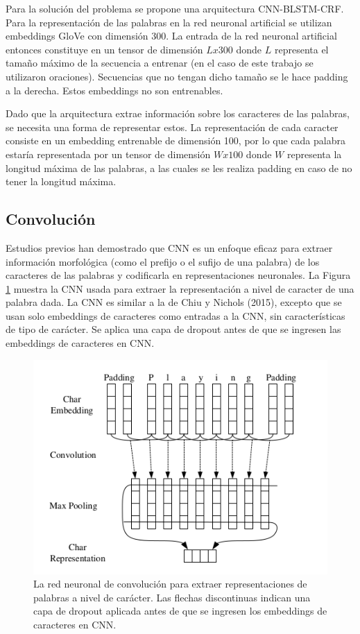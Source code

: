 \documentclass[runningheads]{llncs}
\begin{document}
Para la solución del problema se propone una arquitectura CNN-BLSTM-CRF. Para la representación
de las palabras en la red neuronal artificial se utilizan embeddings GloVe con dimensión 300.
La entrada de la red neuronal artificial entonces constituye en un tensor de dimensión 
$Lx300$ donde $L$ representa el tamaño máximo de la secuencia a entrenar (en el caso de este trabajo
se utilizaron oraciones). Secuencias que no tengan dicho tamaño se le hace padding a la derecha. 
Estos embeddings no son entrenables.

Dado que la arquitectura extrae información sobre los caracteres de las palabras, se necesita
una forma de representar estos. La representación de cada caracter consiste en un embedding
entrenable de dimensión 100, por lo que cada palabra estaría representada por un tensor de
dimensión $Wx100$ donde $W$ representa la longitud máxima de las palabras, a las cuales se
les realiza padding en caso de no tener la longitud máxima.

\subsection{Convolución}

Estudios previos han demostrado que CNN es un 
enfoque eficaz para extraer información morfológica (como el prefijo o el sufijo de una palabra) 
de los caracteres de las palabras y codificarla en representaciones neuronales. La Figura \ref{F1} muestra 
la CNN usada para extraer la representación a nivel de caracter de una palabra dada. La CNN 
es similar a la de Chiu y Nichols (2015), excepto que se usan solo embeddings de caracteres como 
entradas a la CNN, sin características de tipo de carácter. Se aplica una capa de dropout antes de que se ingresen las embeddings de caracteres en CNN.

\begin{figure}
	\centering
	\includegraphics[width=12cm]{Fig_1.png}
	\caption{ La red neuronal de convolución para extraer representaciones de palabras 
	a nivel de carácter. Las flechas discontinuas indican una capa de dropout aplicada antes 
	de que se ingresen los embeddings de caracteres en CNN.}
	\label{F1}
\end{figure}
\end{document}
